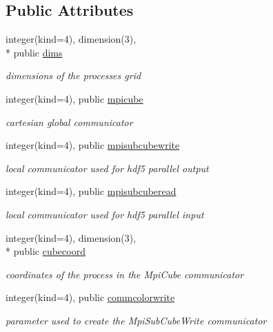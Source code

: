 \subsection*{Public Attributes}
\begin{DoxyCompactItemize}
\item 
integer(kind=4), dimension(3), \\*
public \hyperlink{classmodmpicom_ab53b6d73e6ad2ed312af8e9fcacdcd39}{dims}
\begin{DoxyCompactList}\small\item\em dimensions of the processes grid \end{DoxyCompactList}\item 
integer(kind=4), public \hyperlink{classmodmpicom_a98a18237a2ccfdfdfd230104e90e9b5d}{mpicube}
\begin{DoxyCompactList}\small\item\em cartesian global communicator \end{DoxyCompactList}\item 
integer(kind=4), public \hyperlink{classmodmpicom_aa4714e524c20e853ca0d8eee443a3eaa}{mpisubcubewrite}
\begin{DoxyCompactList}\small\item\em local communicator used for hdf5 parallel output \end{DoxyCompactList}\item 
integer(kind=4), public \hyperlink{classmodmpicom_a0e30077f764b1d64af266f38546eb11b}{mpisubcuberead}
\begin{DoxyCompactList}\small\item\em local communicator used for hdf5 parallel input \end{DoxyCompactList}\item 
integer(kind=4), dimension(3), \\*
public \hyperlink{classmodmpicom_a82b7ffcc29d150ab9a64cbf53757feca}{cubecoord}
\begin{DoxyCompactList}\small\item\em coordinates of the process in the Mpi\-Cube communicator \end{DoxyCompactList}\item 
integer(kind=4), public \hyperlink{classmodmpicom_ac492fd7b2b0e1274ab259b5377a8a907}{commcolorwrite}
\begin{DoxyCompactList}\small\item\em parameter used to create the Mpi\-Sub\-Cube\-Write communicator \end{DoxyCompactList}\item 

\end{DoxyCompactItemize}
